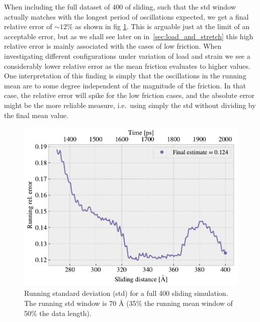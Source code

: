 When including the full dataset of \SI{400}{} of sliding, such that the \acrshort{std} window actually matches with the longest period of oscillations expected, we get a final relative error of $\sim 12 \%$ as shown in fig \cref{fig:runstd_long}. This is arguable just at the limit of an acceptable error, but as we shall see later on in~\cref{sec:load_and_stretch} this high relative error is mainly associated with the cases of low friction. When investigating different configurations under variation of load and strain we see a considerably lower relative error as the mean friction evaluates to higher values. One interpretation of this finding is simply that the oscillations in the running mean are to some degree independent of the magnitude of the friction. In that case, the relative error will spike for the low friction cases, and the absolute error might be the more reliable measure, i.e.\ using simply the \acrshort{std} without dividing by the final mean value.


\begin{figure}[H]
  \centering
  \includegraphics[width=0.6\linewidth]{figures/baseline/Ff_runstd_long.pdf}
  \caption{Running standard deviation (std) for a full \SI{400}{{}} sliding simulation. The running std window is 70 Å (35\% the running mean window of 50\% the data length).}
  \label{fig:runstd_long}
\end{figure}


